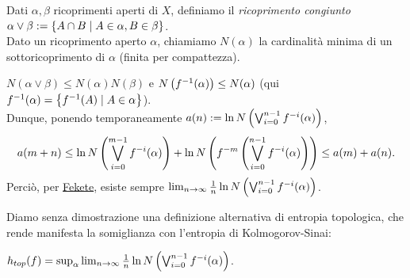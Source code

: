 \begin{defi}Dati $\alpha,\beta$ ricoprimenti aperti di $X$, definiamo il \emph{ricoprimento congiunto}
$\alpha\vee\beta:=\left\{A\cap B\mid A\in\alpha,B\in\beta\right\}$. \\
Dato un ricoprimento aperto $\alpha$, chiamiamo $N(\alpha)$ la cardinalità minima di un sottoricoprimento di $\alpha$
(finita per compattezza).
\end{defi}

\begin{oss}$N(\alpha\vee\beta)\le N(\alpha)N(\beta)$ e $N\left(f^{-1}(\alpha)\right)\le N(\alpha)$
(qui $f^{-1}(\alpha)=\left\{f^{-1}(A)\mid A\in\alpha\right\}$). \\
Dunque, ponendo temporaneamente $a(n):=\ln N\left(\bigvee_{i=0}^{n-1}f^{-i}(\alpha)\right)$,
\[ a(m+n)\le\ln N\left(\bigvee_{i=0}^{m-1}f^{-i}(\alpha)\right)+\ln N\left(f^{-m}\left(\bigvee_{i=0}^{n-1}f^{-i}(\alpha)\right)\right)
\le a(m)+a(n). \]
Perciò, per \hyperref[fekete]{Fekete}, esiste sempre $\lim_{n\to\infty}\frac{1}{n}\ln N\left(\bigvee_{i=0}^{n-1}f^{-i}(\alpha)\right)$.
\end{oss}

Diamo senza dimostrazione una definizione alternativa di entropia topologica, che rende manifesta la somiglianza con l'entropia
di Kolmogorov-Sinai:

\begin{teo}$h_{top}(f)=\sup_\alpha\lim_{n\to\infty}\frac{1}{n}\ln N\left(\bigvee_{i=0}^{n-1}f^{-i}(\alpha)\right)$.
\end{teo}